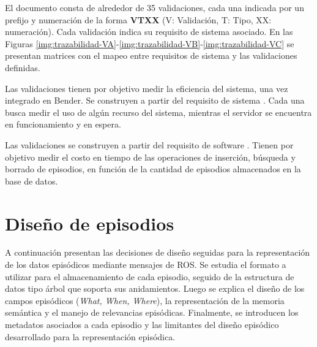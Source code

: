 El documento consta de alrededor de 35 validaciones, cada una indicada por un prefijo y numeración de la forma {\bfseries VTXX} (V: Validación, T: Tipo, XX: numeración). Cada validación indica su requisito de sistema asociado. En las Figuras \ref{img:trazabilidad-VA}-\ref{img:trazabilidad-VB}-\ref{img:trazabilidad-VC} se presentan matrices con el mapeo entre requisitos de sistema y las validaciones definidas.

Las validaciones  tienen por objetivo medir la eficiencia del sistema, una vez integrado en Bender. Se construyen a partir del requisito de sistema . Cada una busca medir el uso de algún recurso del sistema, mientras el servidor se encuentra en funcionamiento y en espera. 

Las validaciones  se construyen a partir del requisito de software . Tienen por objetivo medir el costo en tiempo de las operaciones de inserción, búsqueda y borrado de episodios, en función de la cantidad de episodios almacenados en la base de datos.





\section{Diseño de episodios}

A continuación presentan las decisiones de diseño seguidas para la representación de los datos episódicos mediante mensajes de ROS. Se estudia el formato a utilizar para el almacenamiento de cada episodio, seguido de la estructura de datos tipo árbol que soporta sus anidamientos. Luego se explica el diseño de los campos episódicos (\textit{What, When, Where}), la representación de la memoria semántica y el manejo de relevancias episódicas. Finalmente, se introducen los metadatos asociados a cada episodio y las limitantes del diseño episódico desarrollado para la representación episódica.

